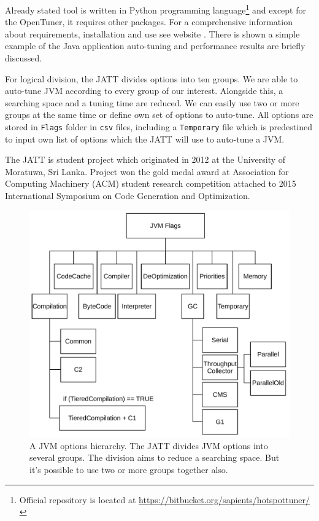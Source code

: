 \documentclass[
  digital, %
  oneside,
  notable, %
  nolof,     %
  nolot     %
]{fithesis3}
\begin{document}
Already stated tool is written in Python programming language\footnote{Official repository is located at \url{https://bitbucket.org/sapients/hotspottuner/}} and except for the OpenTuner, it requires other packages. For a comprehensive information about requirements, installation and use see website \cite{jatt-web-medium}. There is shown a simple example of the Java application auto-tuning and performance results are briefly discussed.

For logical division, the JATT divides options into ten groups. We are able to auto-tune JVM according to every group of our interest. Alongside this, a searching space and a tuning time are reduced. We can easily use two or more groups at the same time or define own set of options to auto-tune. All options are stored in \texttt{Flags} folder in \texttt{csv} files, including a \texttt{Temporary} file which is predestined to input own list of options which the JATT will use to auto-tune a JVM.

The JATT is student project which originated in 2012 at the University of Moratuwa, Sri Lanka. Project won the gold medal award at Association for Computing Machinery (ACM) student research competition attached to 2015 International Symposium on Code Generation and Optimization. \cite{jatt-web}

\begin{figure}[h]
	\centering
	\includegraphics[width=13cm]{fig/flags.pdf}
	\caption{A JVM options hierarchy. The JATT divides JVM options into several groups. The division aims to reduce a searching space. But it's possible to use two or more groups together also. \cite{jatt-progress} \cite{jatt-web-medium}}
	\label{jatt-hierarchy}
\end{figure}
\end{document}
